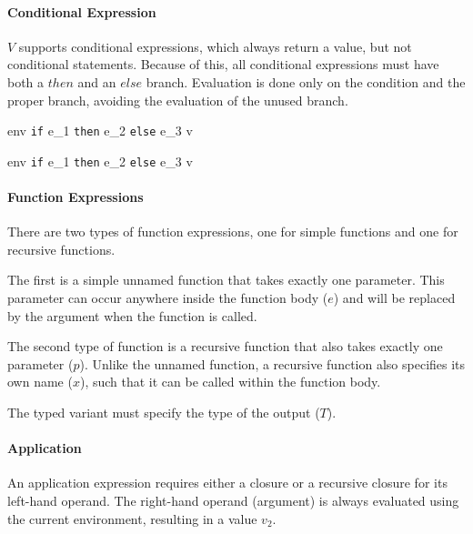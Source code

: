 \documentclass{article}
\begin{document}
\paragraph{Conditional Expression}
$V$ supports conditional expressions, which always return a value, but not conditional statements.
Because of this, all conditional expressions must have both a $then$ and an $else$ branch.
Evaluation is done only on the condition and the proper branch, avoiding the evaluation of the unused branch.

    {\mbox{env} \vdash \texttt{if} \; e_1\; \texttt{then} \; e_2 \; \texttt{else} \; e_3 \Downarrow v}

    {\mbox{env} \vdash \texttt{if} \; e_1\; \texttt{then} \; e_2 \; \texttt{else} \; e_3 \Downarrow v}

\paragraph{Function Expressions}

There are two types of function expressions, one for simple functions and one for recursive functions.

\smallskip

The first is a simple unnamed function that takes exactly one parameter.
This parameter can occur anywhere inside the function body ($e$) and will be replaced by the argument when the function is called.


The second type of function is a recursive function that also takes exactly one parameter ($p$).
Unlike the unnamed function, a recursive function also specifies its own name ($x$), such that it can be called within the function body.

The typed variant must specify the type of the output ($T$).



\paragraph{Application}
An application expression requires either a closure or a recursive closure for its left-hand operand.
The right-hand operand (argument) is always evaluated using the current environment, resulting in a value $v_2$.
\smallskip
\end{document}

